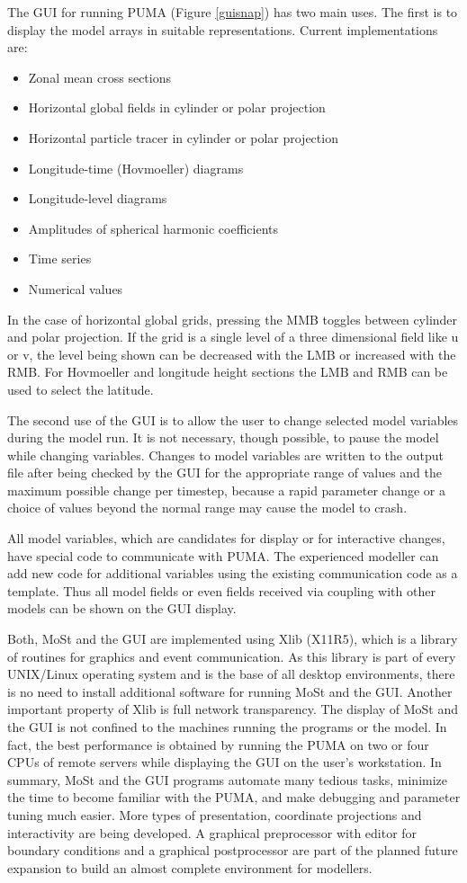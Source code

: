 The GUI for running PUMA
(Figure \ref{guisnap})
has two main uses. The first is to display the
model arrays in suitable representations.
Current implementations are:
\begin{itemize}
\item{Zonal mean cross sections}
\item{Horizontal global fields in cylinder or polar projection}
\item{Horizontal particle tracer in cylinder or polar projection}
\item{Longitude-time (Hovmoeller) diagrams}
\item{Longitude-level diagrams}
\item{Amplitudes of spherical harmonic coefficients}
\item{Time series}
\item{Numerical values}
\end{itemize}

In the case of horizontal global grids, pressing the MMB 
toggles between cylinder and polar projection. If the grid is
a single level of a three dimensional field like u or v,
the level being shown can be decreased with the LMB or increased with the RMB.
For Hovmoeller and longitude height sections the LMB and RMB can
be used to select the latitude.

The second use of the GUI is to allow the user to change
selected model variables during the model run.
It is not necessary, though possible, to pause the
model while changing variables. Changes to model variables
are written to the output file after being checked
by the GUI for the appropriate range of values and the 
maximum possible change per timestep, because 
a rapid parameter change or a choice of values beyond the normal
range may cause the model to crash.

All model variables, which are candidates for display
or for interactive changes, have special code to communicate
with PUMA. The experienced modeller
can add new code for additional variables using the existing
communication code as a template. Thus all model fields
or even fields received via coupling with other models
can be shown on the GUI display.

Both, MoSt and the GUI are implemented using Xlib (X11R5),
which is a library of routines for graphics and event communication.
As this library is part of every UNIX/Linux operating system
and is the base of all desktop environments, there is no need
to install additional software for running MoSt and the GUI.
Another important  property of Xlib is full network transparency.
The display of MoSt and the GUI is not confined to the machines
running the programs or the model. In fact, the best
performance is obtained by running the PUMA on
two or four CPUs of remote servers while displaying
the GUI on the user's workstation.
In summary, MoSt and the GUI programs automate many tedious tasks,
minimize the time to become familiar with the PUMA,
and make debugging and parameter tuning much easier.
More types of presentation, coordinate projections
and interactivity are being developed.
A graphical preprocessor with editor for boundary
conditions and a graphical postprocessor are part of the planned
future expansion
to build an almost complete environment for modellers.

